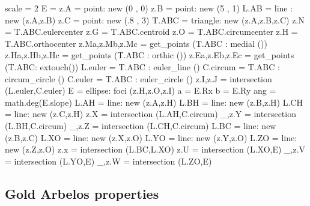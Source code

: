 \begin{tkzelements}
scale = 2
E = {}
z.A      = point: new (0 , 0)
z.B      = point: new (5 , 1)
L.AB     = line : new (z.A,z.B)
z.C      = point: new (.8 , 3)
T.ABC    = triangle: new (z.A,z.B,z.C)
z.N = T.ABC.eulercenter
z.G = T.ABC.centroid
z.O = T.ABC.circumcenter
z.H = T.ABC.orthocenter
z.Ma,z.Mb,z.Mc = get_points (T.ABC : medial ())
z.Ha,z.Hb,z.Hc = get_points (T.ABC : orthic ())   
z.Ea,z.Eb,z.Ec   = get_points (T.ABC: extouch())
L.euler      = T.ABC : euler_line () 
C.circum     = T.ABC : circum_circle () 
C.euler      = T.ABC : euler_circle () 
z.I,z.J      = intersection (L.euler,C.euler) 
 E = ellipse: foci (z.H,z.O,z.I)  
a = E.Rx
b = E.Ry
ang     = math.deg(E.slope)
L.AH    = line: new (z.A,z.H)
L.BH    = line: new (z.B,z.H)
L.CH    = line: new (z.C,z.H)
z.X     = intersection (L.AH,C.circum)  
_,z.Y   = intersection (L.BH,C.circum)  
_,z.Z   = intersection (L.CH,C.circum)  
L.BC    = line: new (z.B,z.C) 
L.XO    = line: new (z.X,z.O)
L.YO    = line: new (z.Y,z.O)
L.ZO    = line: new (z.Z,z.O)
z.x     = intersection (L.BC,L.XO)
z.U     = intersection (L.XO,E)
_,z.V   = intersection (L.YO,E)
_,z.W   = intersection (L.ZO,E) 
\end{tkzelements}

\hspace*{\fill}
\hspace*{\fill}

\subsection{Gold Arbelos properties} %
\label{sub:gold_arbelos_properties}

